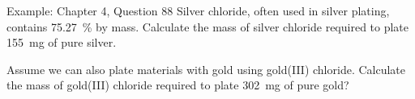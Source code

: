 \documentclass[notes=onlyslideswithnotes,notes=hide]{beamer}
\begin{document}
\begin{frame}[t]{Example: Chapter 4, Question 88}
	Silver chloride, often used in silver plating, contains
	\SI{75.27}{\percent}  by mass. Calculate the mass of silver
	chloride required to plate \SI{155}{\milli\gram} of pure silver.


\end{frame}

\begin{onyourown}
	Assume we can also plate materials with gold using gold(III) chloride.
	Calculate the mass of gold(III) chloride required to plate
	\SI{302}{\milli\gram} of pure gold?
\end{onyourown}
	
\end{document}
